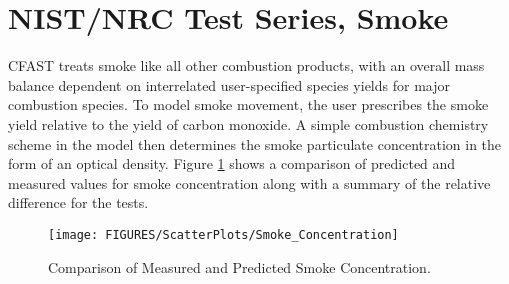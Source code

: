 \section{NIST/NRC Test Series, Smoke}

CFAST treats smoke like all other combustion products, with an overall mass balance dependent on interrelated user-specified species yields for major combustion species.  To model smoke movement, the user prescribes the smoke yield relative to the yield of carbon monoxide.  A simple combustion chemistry scheme in the model then determines the smoke particulate concentration in the form of an optical density.  Figure \ref{fig:Smoke_Scatter} shows a comparison of predicted and measured values for smoke concentration along with a summary of the relative difference for the tests.
\label{Smoke Concentration}

\begin{figure}
\begin{center}
\texttt{[image: FIGURES/ScatterPlots/Smoke\_Concentration]}  \\
\end{center}
\caption{Comparison of Measured and Predicted Smoke Concentration.} \label{fig:Smoke_Scatter}
\end{figure}

